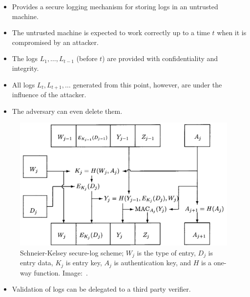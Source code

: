 \begin{frame}
  \begin{idea}
    \begin{itemize}
      \item Provides a secure logging mechanism for storing logs in an untrusted 
        machine.

      \item The untrusted machine is expected to work correctly up to a time 
        \(t\) when it is compromised by an attacker.

      \item The logs \(L_1, \ldots, L_{t-1}\) (before \(t\)) are provided with 
        confidentiality and integrity.
    \end{itemize}
  \end{idea}

  \pause

  \begin{remark}
    \begin{itemize}
      \item All logs \(L_t, L_{t+1}, \ldots\) generated from this point, however, 
        are under the influence of the attacker.

      \item The adversary can even delete them.
    \end{itemize}
  \end{remark}
\end{frame}

\begin{frame}
  \begin{figure}
    \includegraphics[height=0.7\textheight]{seclog.png}
    \caption{%
      Schneier-Kelsey secure-log scheme; \(W_j\) is the type of entry, \(D_j\) 
      is entry data, \(K_j\) is entry key, \(A_j\) is authentication key, and 
      \(H\) is a one-way function.
      Image:~\cite{schneier1999secure}.
    }
  \end{figure}
\end{frame}

\begin{frame}
  \begin{remark}
    \begin{itemize}
      \item Validation of logs can be delegated to a third party verifier.
    \end{itemize}
  \end{remark}
\end{frame}



\begin{frame}
  \small
  \printbibliography{}
\end{frame}


